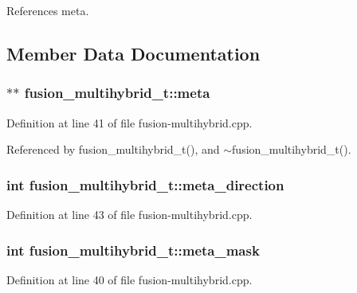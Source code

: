 References meta.

\subsection{Member Data Documentation}
\subsubsection[{meta}]{$\ast$$\ast$ {\bf fusion\_\-multihybrid\_\-t::meta}\hspace{0.3cm}{\tt  [protected]}}\label{classfusion__multihybrid__t_ae6707a67dde16a3f6772598b18bd9bd}




Definition at line 41 of file fusion-multihybrid.cpp.

Referenced by fusion\_\-multihybrid\_\-t(), and $\sim$fusion\_\-multihybrid\_\-t().
\subsubsection[{meta\_\-direction}]{\setlength{\rightskip}{0pt plus 5cm}int {\bf fusion\_\-multihybrid\_\-t::meta\_\-direction}\hspace{0.3cm}{\tt  [protected]}}\label{classfusion__multihybrid__t_a2a0037cdf520ad0df742558fa1664d2}




Definition at line 43 of file fusion-multihybrid.cpp.
\subsubsection[{meta\_\-mask}]{\setlength{\rightskip}{0pt plus 5cm}int {\bf fusion\_\-multihybrid\_\-t::meta\_\-mask}\hspace{0.3cm}{\tt  [protected]}}\label{classfusion__multihybrid__t_6fa217a9f77331f1054b81e667743997}




Definition at line 40 of file fusion-multihybrid.cpp.

